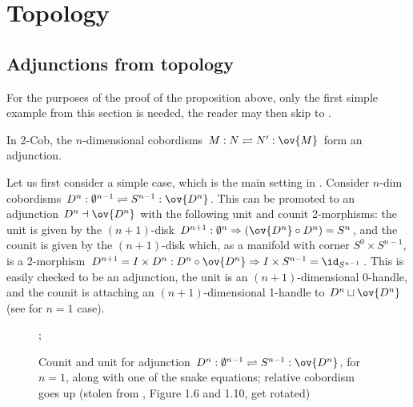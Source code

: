 \documentclass[12pt]{article}
\newcommand{\disk}[1]{{D^{#1}}}
\newcommand{\sphr}[1]{{S^{#1}}}
\newcommand{\empt}[1]{{\emptyset^{#1}}}
\begin{document}
\section{Topology}

\subsection{Adjunctions from topology}
\label{s:topology-adjunctions}

For the purposes of the proof of the proposition above,
only the first simple example from this section is needed,
the reader may then skip to .

In 2-Cob,
the $n$-dimensional cobordisms
$M: N \rightleftharpoons N' : \ov{M}$
form an adjunction.

Let us first consider a simple case,
which is the main setting in .
Consider $n$-dim cobordisms
$\disk{n}: \empt{n-1} \rightleftharpoons
	\sphr{n-1}: \ov{\disk{n}}$.
This can be promoted to an adjunction
$\disk{n} \dashv \ov{\disk{n}}$
with the following unit and counit 2-morphisms:
the unit is given by the $(n+1)$-disk
$\disk{n+1}: \empt{n} \Rightarrow
	(\ov{\disk{n}} \circ \disk{n}) = \sphr{n}$,
and the counit is given by the $(n+1)$-disk which,
as a manifold with corner $\sphr{0} \times \sphr{n-1}$,
is a 2-morphism
$\disk{n+1} = I \times \disk{n}: \disk{n} \circ \ov{\disk{n}}
	\Rightarrow I \times \sphr{n-1} = \id_{\sphr{n-1}}$.
This is easily checked to be an adjunction,
the unit is an $(n+1)$-dimensional 0-handle,
and the counit is attaching an $(n+1)$-dimensional 1-handle
to $\disk{n} \sqcup \ov{\disk{n}}$
(see  for $n=1$ case).

\begin{figure}[ht]
\hspace{20pt};
\hspace{20pt}
\caption{Counit and unit for adjunction
$\disk{n}: \empt{n-1} \rightleftharpoons
	\sphr{n-1}: \ov{\disk{n}}$,
for $n=1$,
along with one of the snake equations;
relative cobordism goes up
(stolen from \cite{SPries},
Figure 1.6 and 1.10, get rotated)}
\label{f:disk-adjunction}
\end{figure}
\end{document}

